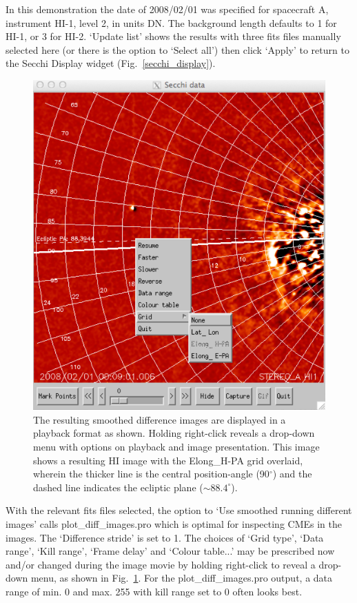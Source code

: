 \documentclass[12pt, a4paper, oneside]{article}
\begin{document}
In this demonstration the date of 2008/02/01 was specified for spacecraft A, instrument HI-1, level 2, in units DN. The background length defaults to 1 for HI-1, or 3 for HI-2. `Update list' shows the results with three fits files manually selected here (or there is the option to `Select all') then click `Apply' to return to the Secchi Display widget (Fig.~\ref{secchi_display}).

\begin{figure}[]
\centering
\includegraphics[scale=0.75]{hi_image_movie.png}
\caption{The resulting smoothed difference images are displayed in a playback format as shown. Holding right-click reveals a drop-down menu with options on playback and image presentation. This image shows a resulting HI image with the Elong\_H-PA grid overlaid, wherein the thicker line is the central position-angle (90$^{\circ}$) and the dashed line indicates the ecliptic plane ($\sim88.4^{\circ}$).}
\label{hi_image_movie}
\end{figure}

With the relevant fits files selected, the option to `Use smoothed running different images' calls plot\_diff\_images.pro which is optimal for inspecting CMEs in the images. The `Difference stride' is set to 1. The choices of `Grid type', `Data range', `Kill range', `Frame delay' and `Colour table...' may be prescribed now and/or changed during the image movie by holding right-click to reveal a drop-down menu, as shown in Fig.~\ref{hi_image_movie}. For the plot\_diff\_images.pro output, a data range of min. 0 and max. 255 with kill range set to 0 often looks best.
\end{document}
